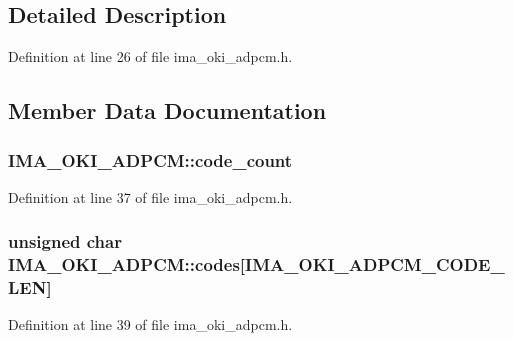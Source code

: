 \subsection{Detailed Description}


Definition at line 26 of file ima\+\_\+oki\+\_\+adpcm.\+h.



\subsection{Member Data Documentation}
\subsubsection[{\texorpdfstring{code\+\_\+count}{code_count}}]{ I\+M\+A\+\_\+\+O\+K\+I\+\_\+\+A\+D\+P\+C\+M\+::code\+\_\+count}\hypertarget{struct_i_m_a___o_k_i___a_d_p_c_m_aab39bf9aefa5d488d28c513a627d2c98}{}\label{struct_i_m_a___o_k_i___a_d_p_c_m_aab39bf9aefa5d488d28c513a627d2c98}


Definition at line 37 of file ima\+\_\+oki\+\_\+adpcm.\+h.

\subsubsection[{\texorpdfstring{codes}{codes}}]{\setlength{\rightskip}{0pt plus 5cm}unsigned char I\+M\+A\+\_\+\+O\+K\+I\+\_\+\+A\+D\+P\+C\+M\+::codes\mbox{[}{\bf I\+M\+A\+\_\+\+O\+K\+I\+\_\+\+A\+D\+P\+C\+M\+\_\+\+C\+O\+D\+E\+\_\+\+L\+EN}\mbox{]}}\hypertarget{struct_i_m_a___o_k_i___a_d_p_c_m_a819c2b67b38be32caa93c1a5629ee0d4}{}\label{struct_i_m_a___o_k_i___a_d_p_c_m_a819c2b67b38be32caa93c1a5629ee0d4}


Definition at line 39 of file ima\+\_\+oki\+\_\+adpcm.\+h.

